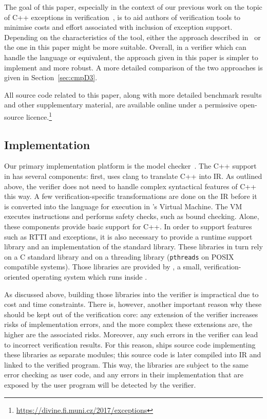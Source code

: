 The goal of this paper, especially in the context of our previous work
on the topic of C++ exceptions in
verification~\cite{rockai16:model.checkin}, is to aid authors of
verification tools to minimise costs and effort associated with
inclusion of exception support. Depending on the characteristics of the
tool, either the approach described in~\cite{rockai16:model.checkin} or
the one in this paper might be more suitable. Overall, in a verifier
which can handle the \divm{} language or equivalent, the approach given in
this paper is simpler to implement and more robust. A more detailed
comparison of the two approaches is given in Section~\ref{sec:cmpD3}.

All source code related to this paper, along with more detailed
benchmark results and other supplementary material, are available online
under a permissive open-source licence.\footnote{\url{https://divine.fi.muni.cz/2017/exceptions}}

\subsection{Implementation}\label{implementation}

Our primary implementation platform is the \divine{} model
checker~\cite{barnat13:divine}. The C++ support in \divine{} has several
components: first, \divine{} uses clang to translate C++ into \llvm{} IR. As
outlined above, the verifier does not need to handle complex syntactical
features of C++ this way. A few verification-specific transformations
are done on the \llvm{} IR before it is converted into the \divm{} language
for execution in \divine{}'s Virtual Machine. The VM executes instructions
and performs safety checks, such as bound checking. Alone, these
components provide basic support for C++. In order to support features
such as RTTI and exceptions, it is also necessary to provide a runtime
support library and an implementation of the standard library. These
libraries in turn rely on a C standard library and on a threading
library (\texttt{pthreads} on POSIX compatible systems). Those libraries
are provided by \dios{}, a small, verification-oriented operating system
which runs inside \divm{}.

As discussed above, building those libraries into the verifier is
impractical due to cost and time constraints. There is, however, another
important reason why these should be kept out of the verification core:
any extension of the verifier increases risks of implementation errors,
and the more complex these extensions are, the higher are the associated
risks. Moreover, any such errors in the verifier can lead to incorrect
verification results. For this reason, \divine{} ships source code
implementing these libraries as separate modules; this source code is
later compiled into \llvm{} IR and linked to the verified program. This
way, the libraries are subject to the same error checking as user code,
and any errors in their implementation that are exposed by the user
program will be detected by the verifier.

